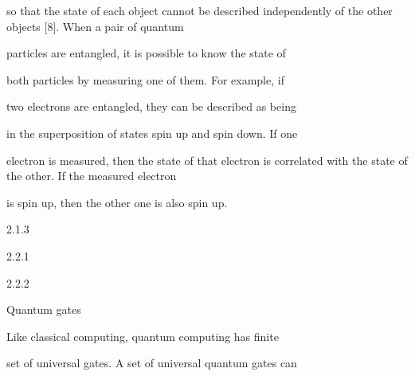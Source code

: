\documentclass[a4paper,portrait,12pt]{article}
\begin{document}
\begin{flushleft}
so that the state of each object cannot be described independently of the other objects [8]. When a pair of quantum
\end{flushleft}


\begin{flushleft}
particles are entangled, it is possible to know the state of
\end{flushleft}


\begin{flushleft}
both particles by measuring one of them. For example, if
\end{flushleft}


\begin{flushleft}
two electrons are entangled, they can be described as being
\end{flushleft}


\begin{flushleft}
in the superposition of states spin up and spin down. If one
\end{flushleft}


\begin{flushleft}
electron is measured, then the state of that electron is correlated with the state of the other. If the measured electron
\end{flushleft}


\begin{flushleft}
is spin up, then the other one is also spin up.
\end{flushleft}





2.1.3





2.2.1





2.2.2





\begin{flushleft}
Quantum gates
\end{flushleft}





\begin{flushleft}
Like classical computing, quantum computing has finite
\end{flushleft}


\begin{flushleft}
set of universal gates. A set of universal quantum gates can
\end{flushleft}
\end{document}
